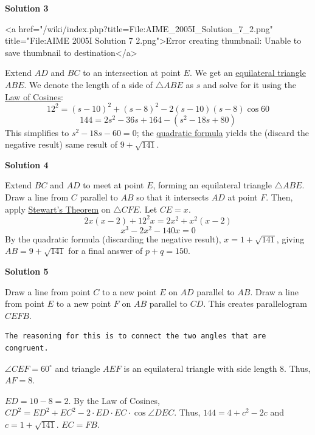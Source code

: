\begin{enumerate}
 



\textbf{Solution 3}

<a href="/wiki/index.php?title=File:AIME\_2005I\_Solution\_7\_2.png" title="File:AIME 2005I Solution 7 2.png">Error creating thumbnail: Unable to save thumbnail to destination</a>

 Extend $AD$ and $BC$ to an intersection at point $E$. We get an \href{https://artofproblemsolving.com/wiki/index.php?title=Equilateral\_triangle}{equilateral triangle} $ABE$. We denote the length of a side of $\triangle ABE$ as $s$ and solve for it using the \href{https://artofproblemsolving.com/wiki/index.php?title=Law\_of\_Cosines}{Law of Cosines}: 
 \[12^2 = (s - 10)^2 + (s - 8)^2 - 2(s - 10)(s - 8)\cos{60}\]
 \[144 = 2s^2 - 36s + 164 - (s^2 - 18s + 80)\] This simplifies to $s^2 - 18s - 60=0$; the \href{https://artofproblemsolving.com/wiki/index.php?title=Quadratic\_formula}{quadratic formula} yields the (discard the negative result) same result of $9 + \sqrt{141}$.

 



\textbf{Solution 4}

Extend $BC$ and $AD$ to meet at point $E$, forming an equilateral triangle $\triangle ABE$. Draw a line from $C$ parallel to $AB$ so that it intersects $AD$ at point $F$. Then, apply \href{https://artofproblemsolving.com/wiki/index.php?title=Stewart\%27s\_Theorem}{Stewart's Theorem} on $\triangle CFE$. Let $CE=x$. 
 \[2x(x-2) + 12^2x = 2x^2 + x^2(x-2)\] 
 \[x^3 - 2x^2 - 140x = 0\] By the quadratic formula (discarding the negative result), $x = 1 + \sqrt{141}$, giving $AB = 9 + \sqrt{141}$ for a final answer of $p+q=150$.

 



\textbf{Solution 5}

Draw a line from point $C$ to a new point $E$ on $AD$ parallel to $AB$. Draw a line from point $E$ to a new point $F$ on $AB$ parallel to $CD$. This creates parallelogram $CEFB$. 

 \begin{verbatim}
The reasoning for this is to connect the two angles that are congruent. 
\end{verbatim}

$\angle CEF = 60^{\circ}$ and triangle $AEF$ is an equilateral triangle with side length 8. Thus, $AF = 8$. 

 $ED = 10 - 8 = 2$. By the Law of Cosines, $CD^2 = ED^2 + EC^2 - 2 \cdot {ED} \cdot {EC} \cdot \cos{\angle DEC}$. Thus, $144 = 4 + c^2 - 2c$ and $c = 1 + \sqrt{141}$. $EC = FB$. 


\end{enumerate}
